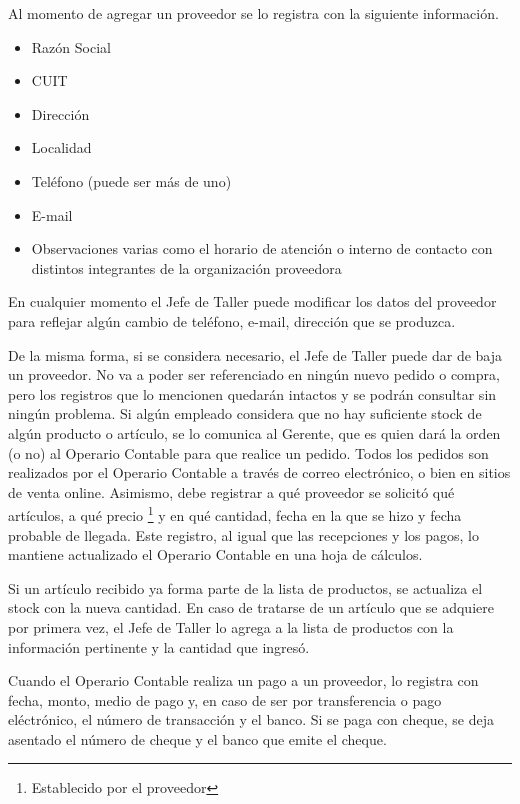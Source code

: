 \documentclass[12pt]{extarticle}
\begin{document}
\begin{spacing}{1.2}
    Al momento de agregar un proveedor se lo registra con la siguiente información.
        \begin{itemize}
            \item Razón Social
            \item CUIT
            \item Dirección
            \item Localidad
            \item Teléfono (puede ser más de uno)
            \item E-mail
            \item Observaciones varias como el horario de atención o interno de contacto con distintos integrantes de la organización proveedora
        \end{itemize}

    En cualquier momento el Jefe de Taller puede modificar los datos del proveedor para reflejar algún cambio de teléfono, e-mail, dirección que se produzca.

    De la misma forma, si se considera necesario, el Jefe de Taller puede dar de baja un proveedor. No va a poder ser referenciado en ningún nuevo pedido o compra, pero los registros que lo mencionen quedarán intactos y se podrán consultar sin ningún problema.
    Si algún empleado considera que no hay suficiente stock de algún producto o artículo, se lo comunica al Gerente, que es quien dará la orden (o no) al Operario Contable para que realice un pedido. Todos los pedidos son realizados por el Operario Contable a través de correo electrónico, o bien en sitios de venta online. Asimismo, debe registrar a qué proveedor se solicitó qué artículos, a qué precio \footnote{Establecido por el proveedor} y en qué cantidad, fecha en la que se hizo y fecha probable de llegada. Este registro, al igual que las recepciones y los pagos, lo mantiene actualizado el Operario Contable en una hoja de cálculos.

    Si un artículo recibido ya forma parte de la lista de productos, se actualiza el stock con la nueva cantidad. En caso de tratarse de un artículo que se adquiere por primera vez, el Jefe de Taller lo agrega a la lista de productos con la información pertinente y la cantidad que ingresó. 
        
    Cuando el Operario Contable realiza un pago a un proveedor, lo registra con fecha, monto, medio de pago y, en caso de ser por transferencia o pago eléctrónico, el número de transacción y el banco. Si se paga con cheque, se deja asentado el número de cheque y el banco que emite el cheque.\\


\end{spacing}
\end{document}
